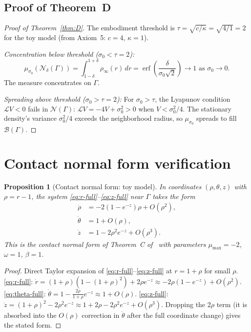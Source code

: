 \documentclass[reqno]{amsart}
\numberwithin{equation}{section}
\theoremstyle{plain}
\newtheorem{proposition}[theorem]{Proposition}
\theoremstyle{definition}
\theoremstyle{remark}
\newcommand{\Orb}{\Gamma}
\newcommand{\cN}{\mathcal{N}}
\newcommand{\cB}{\mathcal{B}}
\newcommand{\cL}{\mathcal{L}}
\DeclareMathOperator{\erf}{erf}
\begin{document}
\subsection{Proof of Theorem~D}

\begin{proof}[Proof of Theorem~\ref{thm:D}]
The embodiment threshold is $\tau=\sqrt{c/\kappa}=\sqrt{4/1}=2$
for the toy model (from Axiom~5: $c=4$, $\kappa=1$).

\emph{Concentration below threshold ($\sigma_0<\tau=2$):}
\[
  \mu_{\sigma_0}(\cN_\delta(\Orb))
  = \int_{1-\delta}^{1+\delta}\rho_\infty(r)\,dr
  = \erf\!\left(\frac{\delta}{\sigma_0\sqrt{2}}\right)\to 1
  \text{ as }\sigma_0\to 0.
\]
The measure concentrates on $\Orb$.

\emph{Spreading above threshold ($\sigma_0>\tau=2$):}
For $\sigma_0>\tau$, the Lyapunov condition $\cL V<0$ fails in
$\cN(\Orb)$: $\cL V=-4V+\sigma_0^2>0$ when $V<\sigma_0^2/4$.
The stationary density's variance $\sigma_0^2/4$ exceeds the
neighborhood radius, so $\mu_{\sigma_0}$ spreads to fill $\cB(\Orb)$.
\end{proof}

\section{Contact normal form verification}\label{sec:normal}

\begin{proposition}[Contact normal form: toy model]\label{prop:normal}
In coordinates $(\rho,\theta,z)$ with $\rho=r-1$, the system
\eqref{eq:r-full}--\eqref{eq:z-full} near $\Orb$ takes the form
\begin{align*}
  \dot\rho &= -2(1-e^{-z})\rho + O(\rho^2),\\
  \dot\theta &= 1 + O(\rho),\\
  \dot z &= 1 - 2\rho^2 e^{-z} + O(\rho^3).
\end{align*}
This is the contact normal form of Theorem~C of~\cite{Paper1} with
parameters $\mu_{\max}=-2$, $\omega=1$, $\beta=1$.
\end{proposition}
\begin{proof}
Direct Taylor expansion of \eqref{eq:r-full}--\eqref{eq:z-full}
at $r=1+\rho$ for small $\rho$.
\eqref{eq:r-full}: $\dot r=(1+\rho)(1-(1+\rho)^2)+2\rho e^{-z}
\approx -2\rho(1-e^{-z})+O(\rho^2)$.
\eqref{eq:theta-full}: $\dot\theta=1-\frac{2\rho}{1+\rho}e^{-z}
\approx 1+O(\rho)$.
\eqref{eq:z-full}: $\dot z=(1+\rho)^2-2\rho^2 e^{-z}
\approx 1+2\rho-2\rho^2 e^{-z}+O(\rho^3)$.
Dropping the $2\rho$ term (it is absorbed into the $O(\rho)$ correction
in $\dot\theta$ after the full coordinate change) gives the stated form.
\end{proof}
\end{document}

